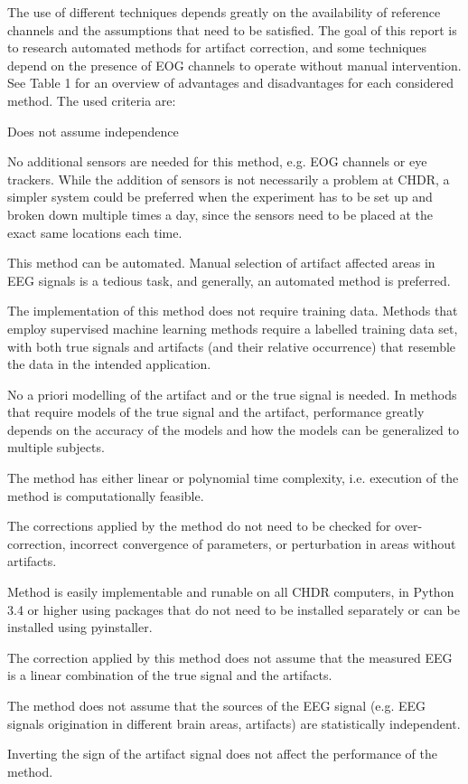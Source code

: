 \documentclass[twoside]{article}
\begin{document}
The use of different techniques depends greatly on the availability of reference channels and the assumptions that need to be satisfied. The goal of this report is to research automated methods for artifact correction, and some techniques depend on the presence of EOG channels to operate without manual intervention. See Table 1 for an overview of advantages and disadvantages for each considered method. The used criteria are: 
\begin{labeling}{Does not assume independence}
\item [No additional sensors] No additional sensors are needed for this method, e.g. EOG channels or eye trackers. While the addition of sensors is not necessarily a problem at CHDR, a simpler system could be preferred when the experiment has to be set up and broken down multiple times a day, since the sensors need to be placed at the exact same locations each time. 
\item [Automated] This method can be automated. Manual selection of artifact affected areas in EEG signals is a tedious task, and generally, an automated method is preferred. 
\item [No training data] The implementation of this method does not require training data. Methods that employ supervised machine learning methods require a labelled training data set, with both true signals and artifacts (and their relative occurrence) that resemble the data in the intended application. 

\item[No modelling] No a priori modelling of the artifact and or the true signal is needed. In methods that require models of the true signal and the artifact, performance greatly depends on the accuracy of the models and how the models can be generalized to multiple subjects. 
\item[Computationally effective] The method has either linear or polynomial time complexity, i.e. execution of the method is computationally feasible. 
\item[No manual checking of results] The corrections applied by the method do not need to be checked for over-correction, incorrect convergence of parameters, or perturbation in areas without artifacts. 
\item[Easy to implement] Method is easily implementable and runable on all CHDR computers, in Python 3.4 or higher using packages that do not need to be installed separately or can be installed using pyinstaller.  
\item[Does not assume linearity] The correction applied by this method does not assume that the measured EEG is a linear combination of the true signal and the artifacts. 
\item[Does not assume independence] The method does not assume that the sources of the EEG signal (e.g. EEG signals origination in different brain areas, artifacts) are statistically independent. 
\item[Insensitive to sign inversion] Inverting the sign of the artifact signal does not affect the performance of the method. 
\end{labeling}
\end{document}
